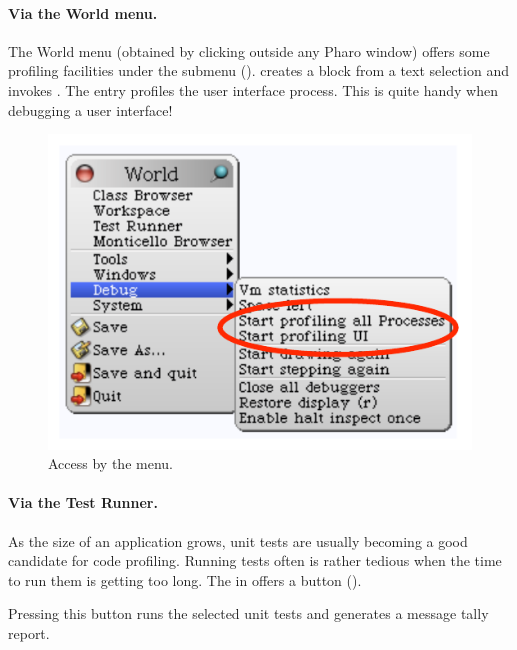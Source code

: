 \documentclass[a4paper,10pt,twoside]{book}
\begin{document}
\paragraph{Via the World menu.}
The World menu (obtained by clicking outside any Pharo window) offers some profiling facilities under the  submenu ().  creates a block from a text selection and invokes . The entry  profiles the user interface process. This is quite handy when debugging a user interface!

\begin{figure}[h]
	\begin{center}
	\includegraphics[width=.6\linewidth]{menu}
	\caption{Access by the menu. }
	\end{center}
\end{figure}



\paragraph{Via the Test Runner.}
As the size of an application grows, unit tests are usually becoming a good candidate for code profiling. Running tests often is rather tedious when the time to run them is getting too long. The  in \pharo offers a button  (). 

Pressing this button runs the selected unit tests and generates a message tally report. 
\end{document}

